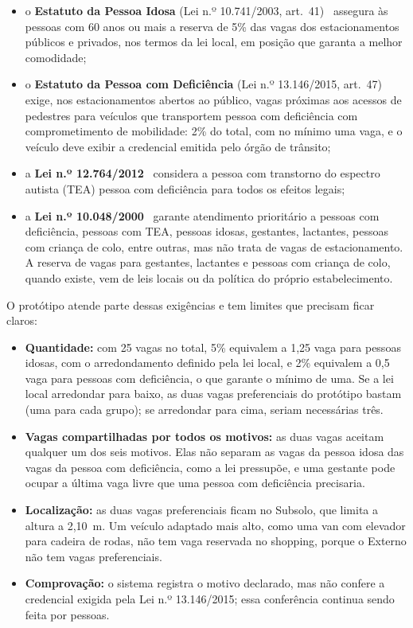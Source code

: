 \begin{itemize}
  \item o \textbf{Estatuto da Pessoa Idosa} (Lei n.º 10.741/2003, art.~41)~\cite{lei10741} assegura às pessoas com 60 anos ou mais a reserva de 5\% das vagas dos estacionamentos públicos e privados, nos termos da lei local, em posição que garanta a melhor comodidade;
  \item o \textbf{Estatuto da Pessoa com Deficiência} (Lei n.º 13.146/2015, art.~47)~\cite{lei13146} exige, nos estacionamentos abertos ao público, vagas próximas aos acessos de pedestres para veículos que transportem pessoa com deficiência com comprometimento de mobilidade: 2\% do total, com no mínimo uma vaga, e o veículo deve exibir a credencial emitida pelo órgão de trânsito;
  \item a \textbf{Lei n.º 12.764/2012}~\cite{lei12764} considera a pessoa com transtorno do espectro autista (TEA) pessoa com deficiência para todos os efeitos legais;
  \item a \textbf{Lei n.º 10.048/2000}~\cite{lei10048} garante atendimento prioritário a pessoas com deficiência, pessoas com TEA, pessoas idosas, gestantes, lactantes, pessoas com criança de colo, entre outras, mas não trata de vagas de estacionamento. A reserva de vagas para gestantes, lactantes e pessoas com criança de colo, quando existe, vem de leis locais ou da política do próprio estabelecimento.
\end{itemize}

O protótipo atende parte dessas exigências e tem limites que precisam ficar claros:

\begin{itemize}
  \item \textbf{Quantidade:} com 25 vagas no total, 5\% equivalem a 1,25 vaga para pessoas idosas, com o arredondamento definido pela lei local, e 2\% equivalem a 0,5 vaga para pessoas com deficiência, o que garante o mínimo de uma. Se a lei local arredondar para baixo, as duas vagas preferenciais do protótipo bastam (uma para cada grupo); se arredondar para cima, seriam necessárias três.
  \item \textbf{Vagas compartilhadas por todos os motivos:} as duas vagas aceitam qualquer um dos seis motivos. Elas não separam as vagas da pessoa idosa das vagas da pessoa com deficiência, como a lei pressupõe, e uma gestante pode ocupar a última vaga livre que uma pessoa com deficiência precisaria.
  \item \textbf{Localização:} as duas vagas preferenciais ficam no Subsolo, que limita a altura a 2,10~m. Um veículo adaptado mais alto, como uma van com elevador para cadeira de rodas, não tem vaga reservada no shopping, porque o Externo não tem vagas preferenciais.
  \item \textbf{Comprovação:} o sistema registra o motivo declarado, mas não confere a credencial exigida pela Lei n.º 13.146/2015; essa conferência continua sendo feita por pessoas.
\end{itemize}

